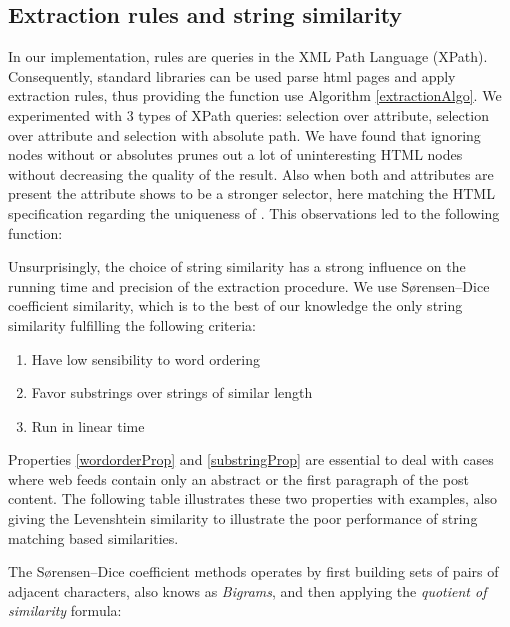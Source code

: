 \clearpage
\subsection{Extraction rules and string similarity}
In our implementation, rules are queries in the XML Path Language (XPath). Consequently, standard libraries can be used parse html pages and apply extraction rules, thus providing the  function use Algorithm \ref{extractionAlgo}. We experimented with 3 types of XPath queries: selection over  attribute, selection over  attribute and selection with absolute path. We have found that ignoring nodes without  or  absolutes prunes out a lot of uninteresting HTML nodes without decreasing  the quality of the result. Also when both  and  attributes are present the  attribute shows to be a stronger selector, here matching the HTML specification regarding the uniqueness of . This observations led to the following  function:

\allrulesAlgo

Unsurprisingly, the choice of string similarity has a strong influence on the running time and precision of the extraction procedure. We use Sørensen–Dice coefficient similarity\cite{dice1945}, which is to the best of our knowledge the only string similarity fulfilling the following criteria:

\begin{enumerate}
  \item\label{wordorderProp} Have low sensibility to word ordering
  \item\label{substringProp} Favor substrings over strings of similar length
  \item\label{linearProp} Run in linear time
\end{enumerate}

Properties \ref{wordorderProp} and \ref{substringProp} are essential to deal with cases where web feeds contain only an abstract or the first paragraph of the post content. The following table illustrates these two properties with examples, also giving the Levenshtein\cite{levenshtein1966} similarity to illustrate the poor performance of string matching based similarities.

\similarityTable

The Sørensen–Dice coefficient methods operates by first building sets of pairs of adjacent characters, also knows as \emph{Bigrams}, and then applying the \emph{quotient of similarity} formula:

